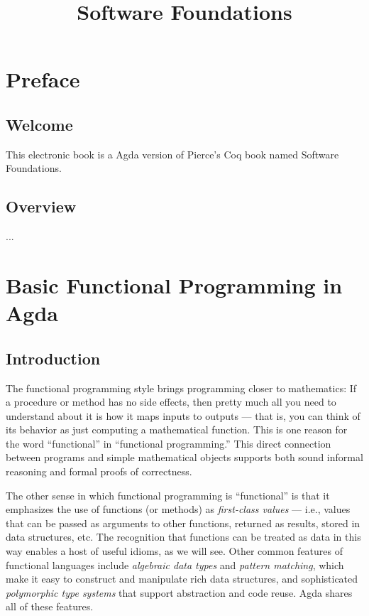 \documentclass{book}
\begin{document}
  \title{Software Foundations}
  \maketitle



\chapter*{Preface}

\section{Welcome}

This electronic book is a Agda version of Pierce's Coq book named Software Foundations.

\section{Overview}

...




\chapter{Basic Functional Programming in Agda}\label{basics}

\section{Introduction}\label{basics-introduction}

The functional programming style brings programming closer to mathematics: 
If a procedure or method has no side effects, then pretty much all you need 
to understand about it is how it maps inputs to outputs --- that is, you can 
think of its behavior as just computing a mathematical function. This is one 
reason for the word ``functional'' in ``functional programming.'' This direct 
connection between programs and simple mathematical objects supports both sound 
informal reasoning and formal proofs of correctness.

The other sense in which functional programming is ``functional'' is that it 
emphasizes the use of functions (or methods) as \textit{first-class values} --- i.e., 
values that can be passed as arguments to other functions, returned as results, 
stored in data structures, etc. The recognition that functions can be treated 
as data in this way enables a host of useful idioms, as we will see.
Other common features of functional languages include \textit{algebraic data types} and 
\textit{pattern matching}, which make it easy to construct and manipulate rich data 
structures, and sophisticated \textit{polymorphic type systems} that support abstraction 
and code reuse. Agda shares all of these features.
\end{document}
